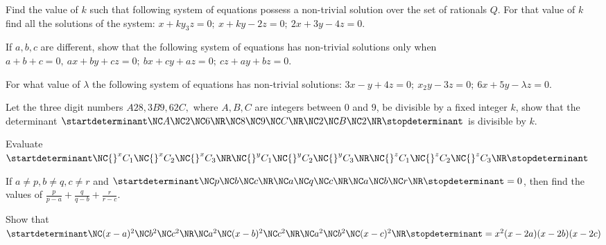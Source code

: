 \item Find the value of $k$ such that following system of equations possess a non-trivial solution over the set of rationals
  $Q$. For that value of $k$ find all the solutions of the system: $x + ky _ 3z = 0;\ x + ky - 2z = 0;\ 2x + 3y - 4z = 0$.
\item If $a, b, c$ are different, show that the following system of equations has non-trivial solutions only when $a + b + c =
  0,\ ax + by + cz = 0;\ bx + cy + az = 0;\ cz + ay + bz = 0$.
\item For what value of $\lambda$ the following system of equations has non-trivial solutions: $3x - y + 4z = 0;\ x _ 2y - 3z = 0;\ 6x
  + 5y - \lambda z = 0$.
\item Let the three digit numbers $A28, 3B9, 62C,$ where $A, B, C$ are integers between $0$ and $9$, be divisible by a fixed
  integer $k$, show that the determinant $\startdeterminant\NC  A \NC 2 \NC 6\NR\NC  8 \NC 9 \NC C \NR\NC  2 \NC B\NC 2\NR\stopdeterminant$ is divisible by $k$.
\item Evaluate $\startdeterminant\NC {}^xC_1 \NC {}^xC_2 \NC {}^xC_3\NR\NC {}^yC_1 \NC {}^yC_2 \NC {}^yC_3\NR\NC {}^zC_1 \NC {}^zC_2 \NC {}^zC_3\NR\stopdeterminant$
\item If $a\neq p, b\neq q, c\neq r$ and $\startdeterminant\NC  p \NC b \NC c\NR\NC a \NC q \NC c\NR\NC a \NC b \NC r\NR\stopdeterminant = 0$, then find the values of
  $\frac{p}{p - a} + \frac{q}{q - b} + \frac{r}{r - c}$.
\item Show that $\startdeterminant\NC (x - a)^2 \NC b^2 \NC c^2 \NR\NC a^2 \NC (x - b)^2 \NC c^2\NR\NC a^2 \NC b^2 \NC (x - c)^2\NR\stopdeterminant = x^2(x - 2a)(x -
  2b)(x - 2c)$

